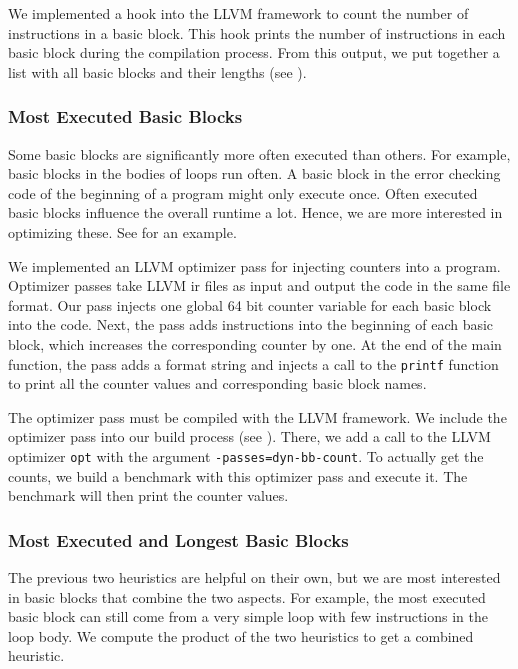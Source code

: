 We implemented a hook into the LLVM framework to count the number of instructions in a basic block.
This hook prints the number of instructions in each basic block during the compilation process.
From this output, we put together a list with all basic blocks and their lengths (see ).

\subsubsection{Most Executed Basic Blocks}
Some basic blocks are significantly more often executed than others.
For example, basic blocks in the bodies of loops run often.
A basic block in the error checking code of the beginning of a program might only execute once.
Often executed basic blocks influence the overall runtime a lot.
Hence, we are more interested in optimizing these.
See  for an example.

We implemented an LLVM optimizer pass for injecting counters into a program.
Optimizer passes take LLVM \ac{ir} files as input and output the code in the same file format.
Our pass injects one global 64 bit counter variable for each basic block into the code.
Next, the pass adds instructions into the beginning of each basic block, which increases the corresponding counter by one.
At the end of the main function, the pass adds a format string and injects a call to the \lstinline{printf} function to print all the counter values and corresponding basic block names.

The optimizer pass must be compiled with the LLVM framework.
We include the optimizer pass into our build process (see ).
There, we add a call to the LLVM optimizer \lstinline{opt} with the argument \mbox{\lstinline{-passes=dyn-bb-count}}.
To actually get the counts, we build a benchmark with this optimizer pass and execute it.
The benchmark will then print the counter values.

\subsubsection{Most Executed and Longest Basic Blocks}
The previous two heuristics are helpful on their own, but we are most interested in basic blocks that combine the two aspects.
For example, the most executed basic block can still come from a very simple loop with few instructions in the loop body.
We compute the product of the two heuristics to get a combined heuristic.

